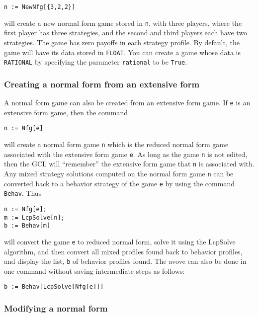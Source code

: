 \begin{verbatim}
n := NewNfg[{3,2,2}]
\end{verbatim}

\noindent 
will create a new normal form game stored in \verb+n+, with three
players, where the first player has three strategies, and the second
and third players each have two strategies.  The game has zero payoffs
in each strategy profile.  By default, the game will have its data
stored in \verb+FLOAT+.  You can create a game whose data is
\verb+RATIONAL+ by specifying the parameter \verb+rational+ to be
\verb+True+.

\subsubsection{Creating a normal form from an extensive form}

A normal form game can also be created from an extensive form game.
If \verb+e+ is an extensive form game, then the command 

\begin{verbatim}
n := Nfg[e]
\end{verbatim}

\noindent
will create a normal form game \verb+n+ which is the reduced normal
form game associated with the extensive form game \verb+e+.  As long
as the game \verb+n+ is not edited, then the GCL will ``remember'' the
extensive form game that \verb+n+ is associated with.  Any mixed
strategy solutions computed on the normal form game \verb+n+ can be
converted back to a behavior strategy of the game \verb+e+ by using
the command \verb+Behav+.  Thus

\begin{verbatim}
n := Nfg[e];
m := LcpSolve[n];
b := Behav[m]
\end{verbatim}

\noindent
will convert the game \verb+e+ to reduced normal form, solve it using
the LcpSolve algorithm, and then convert all mixed profiles found back
to behavior profiles, and display the list, \verb+b+ of behavior
profiles found. The avove can also be done in one command without saving
intermediate steps as follows:  
  
\begin{verbatim}
b := Behav[LcpSolve[Nfg[e]]]
\end{verbatim}

\subsubsection{Modifying a normal form}

